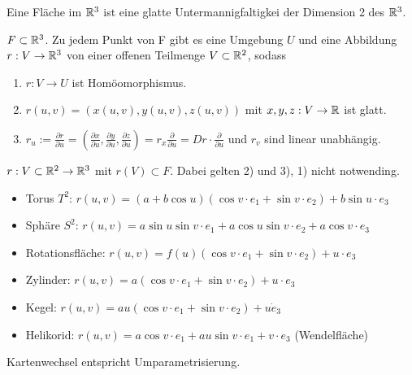 \begin{defi}[Fläche]
    Eine Fläche im $\mathbb R^3$ ist eine glatte Untermannigfaltigkei
    der Dimension 2 des $\mathbb R^3$.
\end{defi}

\begin{bem}
    $F\subset \mathbb R^3$. Zu jedem Punkt von F gibt es eine Umgebung $U$ und eine Abbildung
    $r:V\to\mathbb R^3$ von einer offenen Teilmenge $V\subset\mathbb R^2$, sodass
    \begin{enumerate}
        \item $r:V\to U$ ist Homöomorphismus.
        \item $r(u,v) = (x(u,v),y(u,v),z(u,v))$ mit $x,y,z:V\to \mathbb R$ ist glatt.
        \item $r_u := \frac{\partial r}{\partial u} = 
        (\frac{\partial x}{\partial u},\frac{\partial y}{\partial u}, \frac{\partial z}{\partial u}) = 
        r_x\frac{\partial}{\partial u} = Dr\cdot\frac{\partial }{\partial u}$
        und $r_v$ sind linear unabhängig.
    \end{enumerate}
\end{bem}

\begin{defi}
    $r:V\subset \mathbb R^2\to\mathbb R^3$ mit $r(V)\subset F$.
    Dabei gelten 2) und 3), 1) nicht notwending.
\end{defi}

\begin{bsp}[Parametrisierungen]
    \begin{itemize}
        \item Torus $T^2$: $r(u,v) = (a+b\cos u)(\cos v \cdot e_1 + \sin v \cdot e_2) + b\sin u \cdot e_3$
        \item Sphäre $S^2$: $r(u,v) = a\sin u \sin v \cdot e_1 + a\cos u \sin v \cdot e_2 + a\cos v \cdot e_3$
        \item Rotationsfläche: $r(u,v) = f(u)(\cos v \cdot e_1 + \sin v \cdot e_2) + u \cdot e_3$
        \item Zylinder: $r(u,v) = a(\cos v \cdot e_1 + \sin v \cdot e_2) + u \cdot e_3$
        \item Kegel: $r(u,v) = au(\cos v \cdot e_1 + \sin v \cdot e_2) + u \dot e_3$
        \item Helikorid: $r(u,v) = a \cos v \cdot e_1 + au\sin v \cdot e_1 + v\cdot e_3$ (Wendelfläche)
    \end{itemize}
\end{bsp}

\begin{bem}
    Kartenwechsel entspricht Umparametrisierung.
\end{bem}

